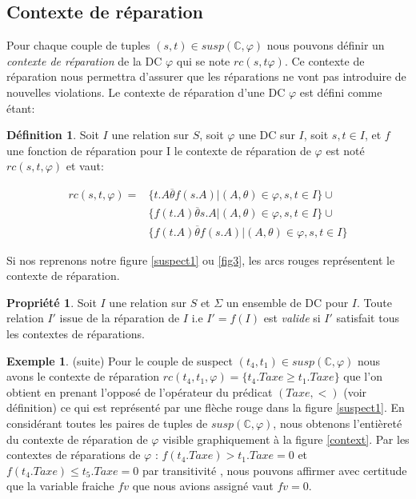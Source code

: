 \documentclass[letterpaper, 12pt]{report}
\theoremstyle{definition}
\newtheorem{mydef}{Définition}
\newtheorem{myprop}{Propriété}
\newtheorem{myexample}{Exemple}
\begin{document}
\subsection{Contexte de réparation}

Pour chaque couple de tuples $(s,t)\in susp(\mathbb{C},\varphi)$ nous pouvons définir un \emph{contexte de réparation} de la DC $\varphi$ qui se note $rc(s,t\varphi)$. Ce contexte de réparation nous permettra d'assurer que les réparations ne vont pas introduire de nouvelles violations. Le contexte de réparation d'une DC $\varphi$ est défini comme étant:

\begin{mydef}
Soit $I$ une relation sur $S$, soit $\varphi$ une DC sur $I$, soit $s,t \in I$, et $f$ une fonction de réparation pour I le contexte de réparation de $\varphi$ est noté $rc(s,t,\varphi)$ et vaut:

\begin{displaymath}
	\begin{split}
		rc(s,t,\varphi) = 
		&\{ t.A \overline{\theta} f(s.A) | (A,\theta) \in \varphi , s,t \in I \}\cup\\
		&\{ f(t.A) \overline{\theta} s.A | (A,\theta) \in \varphi , s,t \in I  \}\cup\\
		&\{ f(t.A) \overline{\theta} f(s.A) | (A,\theta) \in \varphi , s,t \in I  \}
	\end{split}
\end{displaymath}

\end{mydef}
Si nos reprenons notre figure \ref{suspect1}  ou \ref{fig3}, les arcs rouges représentent le contexte de réparation.
 
\begin{myprop}
 Soit $I$ une relation sur $S$ et $\Sigma$ un ensemble de DC pour $I$. Toute relation $I'$ issue de la réparation de $I$ i.e $I' = f(I)$ est \emph{valide} si $I'$ satisfait tous les contextes de réparations.
\end{myprop}

\begin{myexample} (suite)
Pour le couple de suspect $(t_4,t_1) \in susp(\mathbb{C},\varphi)$ nous avons le contexte de réparation $rc(t_4,t_1,\varphi) = \{ t_4.Taxe \geq t_1.Taxe \}$ que l'on obtient en prenant l'opposé de l'opérateur du prédicat $(Taxe, <)$ (voir définition) ce qui est représenté par une flèche rouge dans la figure \ref{suspect1}. En considérant toutes les paires de tuples de $susp(\mathbb{C},\varphi)$, nous obtenons l'entièreté du contexte de réparation de $\varphi$ visible graphiquement à la figure \ref{context}. Par les contextes de réparations de $\varphi$ : $f(t_4.Taxe) > t_1.Taxe = 0$ et $f(t_4.Taxe) \leq t_5.Taxe = 0$ par transitivité , nous pouvons affirmer avec certitude que la variable fraiche $fv$ que nous avions assigné vaut $fv = 0$.
\end{myexample}
\end{document}
